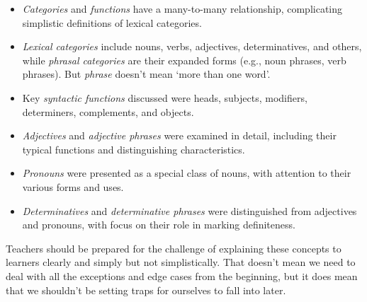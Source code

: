 \begin{itemize}[noitemsep]
    \item \textit{Categories} and \textit{functions} have a many-to-many relationship, complicating simplistic definitions of lexical categories.
    \item \textit{Lexical categories} include nouns, verbs, adjectives, determinatives, and others, while \textit{phrasal categories} are their expanded forms (e.g., noun phrases, verb phrases). But \textit{phrase} doesn't mean `more than one word'.
    \item Key \textit{syntactic functions} discussed were heads, subjects, modifiers, determiners, complements, and objects.
    \item \textit{Adjectives} and \textit{adjective phrases} were examined in detail, including their typical functions and distinguishing characteristics.
    \item \textit{Pronouns} were presented as a special class of nouns, with attention to their various forms and uses.
    \item \textit{Determinatives} and \textit{determinative phrases} were distinguished from adjectives and pronouns, with focus on their role in marking definiteness.
\end{itemize}

Teachers should be prepared for the challenge of explaining these concepts to learners clearly and simply but not simplistically. That doesn't mean we need to deal with all the exceptions and edge cases from the beginning, but it does mean that we shouldn't be setting traps for ourselves to fall into later.